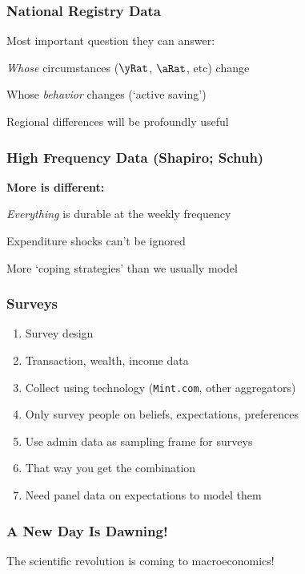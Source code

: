 \begin{frame}\frametitle{National Registry Data}

Most important question they can answer:
\bi
\item {\it Whose} circumstances ($\yRat$, $\aRat$, etc) change
\item Whose {\it behavior} changes (`active saving')
\bi
\item Regional differences will be profoundly useful
\ei
\ei

\end{frame}

\begin{frame}\frametitle{High Frequency Data (Shapiro; Schuh)}

{\bf More is different:}
\bi
\item {\it Everything} is durable at the weekly frequency
\item Expenditure shocks can't be ignored
\item More `coping strategies' than we usually model
\ei

\end{frame}

\begin{frame}\frametitle{Surveys}

\begin{enumerate}
\item Survey design
\bi
\item Transaction, wealth, income data
\bi
\item Collect using technology (\texttt{Mint.com}, other aggregators)
\ei
\item Only survey people on beliefs, expectations, preferences
\ei
\item Use admin data as sampling frame for surveys
\bi
\item That way you get the combination
\ei
\bi
\item Need panel data on expectations to model them
\ei
\end{enumerate}

\end{frame}

\begin{frame}\frametitle{A New Day Is Dawning! }

\pause
The scientific revolution is coming to macroeconomics!


\end{frame}


